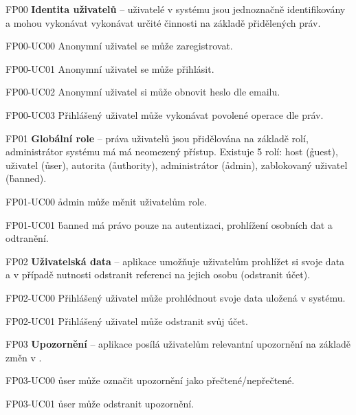 \begin{dl}
   \item[FP00]
   \textbf{Identita uživatelů} – uživatelé v systému jsou jednoznačně identifikovány a mohou vykonávat vykonávat určité činnosti na základě přidělených práv.
   \begin{dl}
      \item[FP00-UC00] Anonymní uživatel se může zaregistrovat.
      \item[FP00-UC01] Anonymní uživatel se může přihlásit.
      \item[FP00-UC02] Anonymní uživatel si může obnovit heslo dle emailu.
      \item[FP00-UC03] Přihlášený uživatel může vykonávat povolené operace dle práv.
   \end{dl}

   \item[FP01]
   \textbf{Globální role} – práva uživatelů jsou přidělována na základě rolí, administrátor systému má má neomezený přístup.
   Existuje 5 rolí: host (\h{guest}), uživatel (\h{user}), autorita (\h{authority}), administrátor (\h{admin}), zablokovaný uživatel (\h{banned}).
   \begin{dl}
      \item[FP01-UC00] \h{admin} může měnit uživatelům role.
      \item[FP01-UC01] \h{banned} má právo pouze na autentizaci, prohlížení osobních dat a odtranění.
   \end{dl}

   \item[FP02]
   \textbf{Uživatelská data} – aplikace umožňuje uživatelům prohlížet si svoje data a v případě nutnosti odstranit referenci na jejich osobu (odstranit účet).
   \begin{dl}
      \item[FP02-UC00] Přihlášený uživatel může prohlédnout svoje data uložená v systému.
      \item[FP02-UC01] Přihlášený uživatel může odstranit svůj účet.
   \end{dl}

   \item[FP03]
   \textbf{Upozornění} – aplikace posílá uživatelům relevantní upozornění na základě změn v .
   \begin{dl}
      \item[FP03-UC00] \h{user} může označit upozornění jako přečtené/nepřečtené.
      \item[FP03-UC01] \h{user} může odstranit upozornění.
   \end{dl}


\end{dl}
